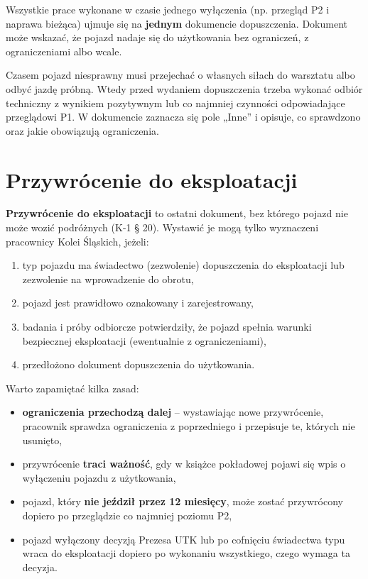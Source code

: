 Wszystkie prace wykonane w czasie jednego wyłączenia (np. przegląd P2 i naprawa bieżąca) ujmuje się na \textbf{jednym} dokumencie dopuszczenia. Dokument może wskazać, że pojazd nadaje się do użytkowania bez ograniczeń, z ograniczeniami albo wcale.

Czasem pojazd niesprawny musi przejechać o własnych siłach do warsztatu albo odbyć jazdę próbną. Wtedy przed wydaniem dopuszczenia trzeba wykonać odbiór techniczny z wynikiem pozytywnym lub co najmniej czynności odpowiadające przeglądowi P1. W dokumencie zaznacza się pole „Inne” i opisuje, co sprawdzono oraz jakie obowiązują ograniczenia.

\section{Przywrócenie do eksploatacji}

\textbf{Przywrócenie do eksploatacji} to ostatni dokument, bez którego pojazd nie może wozić podróżnych (K-1 § 20). Wystawić je mogą tylko wyznaczeni pracownicy Kolei Śląskich, jeżeli:
\begin{enumerate}
	\item typ pojazdu ma świadectwo (zezwolenie) dopuszczenia do eksploatacji lub zezwolenie na wprowadzenie do obrotu,
	\item pojazd jest prawidłowo oznakowany i zarejestrowany,
	\item badania i próby odbiorcze potwierdziły, że pojazd spełnia warunki bezpiecznej eksploatacji (ewentualnie z ograniczeniami),
	\item przedłożono dokument dopuszczenia do użytkowania.
\end{enumerate}

Warto zapamiętać kilka zasad:
\begin{itemize}
	\item \textbf{ograniczenia przechodzą dalej} – wystawiając nowe przywrócenie, pracownik sprawdza ograniczenia z poprzedniego i przepisuje te, których nie usunięto,
	\item przywrócenie \textbf{traci ważność}, gdy w książce pokładowej pojawi się wpis o wyłączeniu pojazdu z użytkowania,
	\item pojazd, który \textbf{nie jeździł przez 12 miesięcy}, może zostać przywrócony dopiero po przeglądzie co najmniej poziomu P2,
	\item pojazd wyłączony decyzją Prezesa UTK lub po cofnięciu świadectwa typu wraca do eksploatacji dopiero po wykonaniu wszystkiego, czego wymaga ta decyzja.
\end{itemize}

